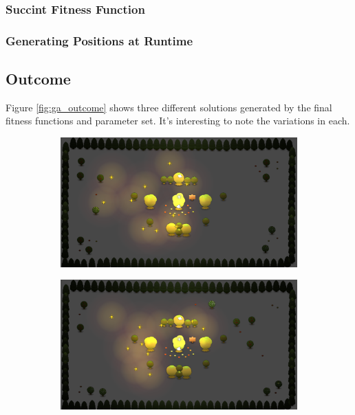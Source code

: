 \subsubsection{Succint Fitness Function}
\subsubsection{Generating Positions at Runtime}


\subsection{Outcome}
Figure \ref{fig:ga_outcome} shows three different solutions generated by the final fitness functions and parameter set.
It's interesting to note the variations in each.
\begin{figure}[h]
        \centering
        \begin{subfigure}[b]{0.48\linewidth}
                \includegraphics[width=\linewidth]{./ga_outcome_1}
                \caption{}
                \label{fig:ga_outcome_1}
        \end{subfigure}
        \begin{subfigure}[b]{0.48\linewidth}
                \includegraphics[width=\linewidth]{./ga_outcome_2}

\end{subfigure}
\end{figure}
